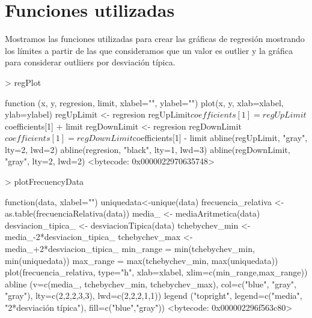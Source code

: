 \documentclass [a4paper] {article}
\begin{document}
\section{Funciones utilizadas}
Mostramos las funciones utilizadas para crear las gráficas de regresión mostrando los límites a partir de las que consideramos que un valor es outlier y la gráfica para considerar outliiers por desviación típica.
\begin{Schunk}
\begin{Sinput}
> regPlot
\end{Sinput}
\begin{Soutput}
function (x, y, regresion, limit, xlabel="", ylabel="") {
  plot(x, y, xlab=xlabel, ylab=ylabel)
  regUpLimit <- regresion
  regUpLimit$coefficients[1] = regUpLimit$coefficients[1] + limit
  regDownLimit <- regresion
  regDownLimit$coefficients[1] = regDownLimit$coefficients[1] - limit
  abline(regUpLimit, "gray", lty=2, lwd=2)
  abline(regresion, "black", lty=1, lwd=3)
  abline(regDownLimit, "gray", lty=2, lwd=2)
}
<bytecode: 0x0000022970635748>
\end{Soutput}
\begin{Sinput}
> plotFrecuencyData
\end{Sinput}
\begin{Soutput}
function(data, xlabel="") {
  uniquedata<-unique(data)
  frecuencia_relativa <- as.table(frecuenciaRelativa(data))
  media_ <- mediaAritmetica(data)
  desviacion_tipica_ <- desviacionTipica(data)
  tchebychev_min <- media_-2*desviacion_tipica_
  tchebychev_max <- media_+2*desviacion_tipica_
  min_range = min(tchebychev_min, min(uniquedata))
  max_range = max(tchebychev_min, max(uniquedata))
  plot(frecuencia_relativa, type="h", xlab=xlabel, xlim=c(min_range,max_range))
  abline (v=c(media_, tchebychev_min, tchebychev_max), 
          col=c("blue", "gray", "gray"), lty=c(2,2,2,3,3),
          lwd=c(2,2,2,1,1))
  legend ("topright", legend=c("media", "2*desviación típica"),
          fill=c("blue","gray"))
}
<bytecode: 0x000002296f563c80>
\end{Soutput}
\end{Schunk}
\end{document}
